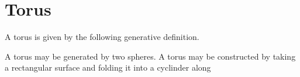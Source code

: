\documentclass[ ../main.tex]{subfiles}
\begin{document}
\section{Torus}
A torus is given by the following generative definition.
\begin{definition}
A torus may be generated by two spheres.
A torus may be constructed by taking a rectangular surface and folding it into a cyclinder along 
\end{definition}
\end{document}
